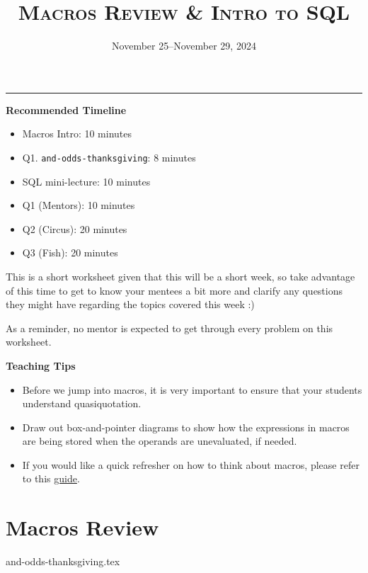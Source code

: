 \documentclass{exam}
\title{\textsc{Macros Review \& Intro to SQL}}
\date{November 25--November 29, 2024}
\begin{document}
\maketitle
\rule{\textwidth}{0.15em}

\begin{meta}
\begin{blocksection}
    \textbf{Recommended Timeline}
    \begin{itemize}
        \item Macros Intro: 10 minutes
        \item Q1. \lstinline{and-odds-thanksgiving}: 8 minutes
        \item SQL mini-lecture: 10 minutes
        \item Q1 (Mentors): 10 minutes
        \item Q2 (Circus): 20 minutes
        \item Q3 (Fish): 20 minutes
    \end{itemize}
\end{blocksection}
\vspace{5mm}
This is a short worksheet given that this will be a short week, so take advantage of this time to get to know your mentees a bit more and clarify any questions they might have regarding the topics covered this week :)

As a reminder, no mentor is expected to get through every problem on this worksheet.
\end{meta}

\vspace{3mm}

\begin{meta}
\textbf{Teaching Tips}
\begin{itemize}
    \item Before we jump into macros, it is very important to ensure that your students understand quasiquotation.
    \item Draw out box-and-pointer diagrams to show how the expressions in macros are being stored when the operands are unevaluated, if needed.
    \item If you would like a quick refresher on how to think about macros, please refer to this \href{https://docs.google.com/document/d/1JSbvtJ5bYUEhovDZd_gQnBvkG_WDcafmX-4B3QeIXZU/edit}{guide}.
\end{itemize}
\end{meta}

\vspace{2mm}

\section{Macros Review}
\begin{questions}
\small
{and-odds-thanksgiving.tex}
\normalsize
\newpage
\end{questions}
\end{document}
